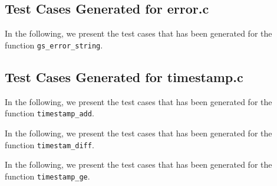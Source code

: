 \newpage
\subsection{Test Cases Generated for error.c}

In the following, we present the test cases that has been generated for the function \texttt{gs\_error\_string}.







\newpage
\subsection{Test Cases Generated for timestamp.c}

In the following, we present the test cases that has been generated for the function \texttt{timestamp\_add}.




In the following, we present the test cases that has been generated for the function \texttt{timestam\_diff}.





In the following, we present the test cases that has been generated for the function \texttt{timestamp\_ge}.


